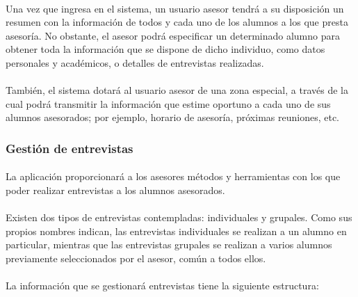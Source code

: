       \paragraph{}Una vez que ingresa en el sistema, un usuario asesor tendrá
      a su disposición un resumen con la información de todos y cada uno de los
      alumnos a los que presta asesoría. No obstante, el asesor podrá
      especificar un determinado alumno para obtener toda la información que
      se dispone de dicho individuo, como datos personales y académicos, o
      detalles de entrevistas realizadas.

      \paragraph{}También, el sistema dotará al usuario asesor de una
      zona especial, a través de la cual podrá transmitir la información que
      estime oportuno a cada uno de sus alumnos asesorados; por ejemplo, horario
      de asesoría, próximas reuniones, etc.

      \subsubsection{Gestión de entrevistas}

      \paragraph{}La aplicación proporcionará a los asesores métodos y
      herramientas con los que poder realizar entrevistas a los alumnos
      asesorados.

      \paragraph{}Existen dos tipos de entrevistas contempladas: individuales y
      grupales. Como sus propios nombres indican, las entrevistas individuales
      se realizan a un alumno en particular, mientras que las entrevistas
      grupales se realizan a varios alumnos previamente seleccionados por el
      asesor, común a todos ellos.

      \paragraph{}La información que se gestionará entrevistas tiene la
      siguiente estructura:

